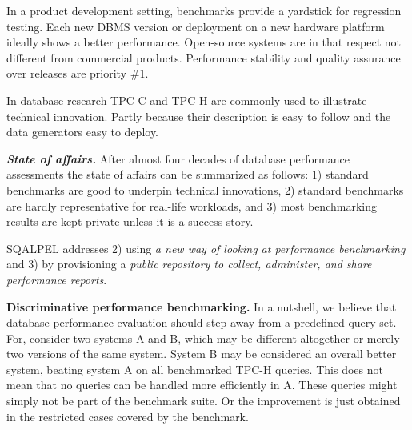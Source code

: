 \documentclass{cidr-2019}
\begin{document}
In a product development setting, benchmarks provide a yardstick for regression testing.
Each new DBMS version or deployment on a new hardware platform ideally shows a better performance.  
Open-source systems are in that respect not different from commercial products. Performance stability and quality assurance over releases are priority \#1.

In database research TPC-C and TPC-H are commonly used to illustrate technical innovation.
Partly because their description is easy to follow and the data generators easy to deploy.

\emph{\bf State of affairs.} After almost four decades of database performance assessments the state of affairs can be summarized as 
follows: 1) standard benchmarks are good to underpin technical innovations, 
2) standard benchmarks are hardly representative for real-life workloads\cite{DBLP:conf/sigmod/VogelsgesangHFK18}, 
and 3) most benchmarking results are kept private unless it is a success story.

{\sc SQALPEL} addresses
2) using \emph{a new way of looking at performance benchmarking}
and 3) by provisioning a \emph{public repository to collect, administer, and share
performance reports}.


{\bf Discriminative performance benchmarking.} 
In a nutshell, we believe that database performance evaluation should step away from 
a predefined query set.
For, consider two systems A and B, which may be different altogether or merely two versions of the
same system. System B may be considered an overall better system, beating system
A on all benchmarked TPC-H queries. This does not mean
that no queries can be handled more efficiently in A. These queries might
simply not be part of the benchmark suite. Or the improvement is just obtained in
the restricted cases covered by the benchmark.
\end{document}
